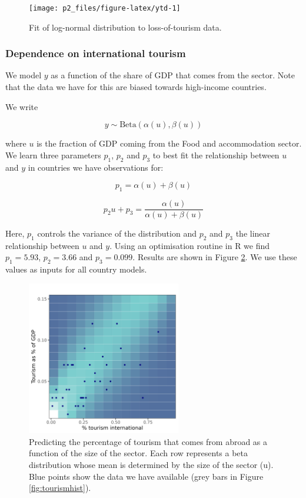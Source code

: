 \documentclass[
]{article}
\begin{document}
\begin{figure}

{\centering \texttt{[image: p2\_files/figure-latex/ytd-1]} 

}

\caption{Fit of log-normal distribution to loss-of-tourism data.}\label{fig:ytd}
\end{figure}

\newpage

\hypertarget{dependence-on-international-tourism}{%
\subsubsection{Dependence on international tourism}\label{dependence-on-international-tourism}}

We model \(y\) as a function of the share of GDP that comes from the sector. Note that the data we have for this are biased towards high-income countries.

We write

\[y\sim\text{Beta}(\alpha(u),\beta(u))\]

where \(u\) is the fraction of GDP coming from the Food and accommodation sector. We learn three parameters \(p_1\), \(p_2\) and \(p_3\) to best fit the relationship between \(u\) and \(y\) in countries we have observations for:

\[p_1 = \alpha(u)+\beta(u)\]

\[p_2u + p_3 = \frac{\alpha(u)}{\alpha(u)+\beta(u)}\]

Here, \(p_1\) controls the variance of the distribution and \(p_2\) and \(p_3\) the linear relationship between \(u\) and \(y\). Using an optimisation routine in R we find \(p_1=5.93\), \(p_2=3.66\) and \(p_3=0.099\). Results are shown in Figure \ref{fig:sectortourism}. We use these values as inputs for all country models.

\begin{figure}
\centering
\includegraphics[width=0.6\textwidth,height=\textheight]{sectortourism.png}
\caption{\label{fig:sectortourism} Predicting the percentage of tourism that comes from abroad as a function of the size of the sector. Each row represents a beta distribution whose mean is determined by the size of the sector (u). Blue points show the data we have available (grey bars in Figure \ref{fig:tourismhist}).}
\end{figure}
\end{document}

